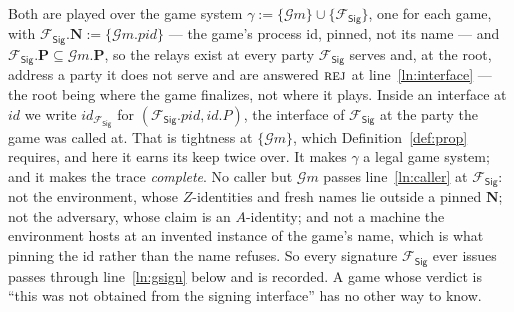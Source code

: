 \documentclass[11pt,a4paper]{article}
\newcommand{\Ps}{\mathbf{P}}
\newcommand{\PID}{\mathit{pid}}
\newcommand{\admits}{\mathbf{N}}
\newcommand{\op}[1]{\textsc{#1}}
\newcommand{\id}{id}
\newcommand{\rej}{\op{rej}}
\newcommand{\Gm}{\mathcal{G}m}
\newcommand{\Fsig}{\mathcal{F}_{\mathsf{Sig}}}
\theoremstyle{accentdef}
\theoremstyle{accentplain}
\begin{document}
Both are played over the game system $\gamma := \{\Gm\} \cup \{\Fsig\}$, one for each game, with
$\Fsig.\admits := \{\Gm.\PID\}$ --- the game's process id, pinned, not its name --- and
$\Fsig.\Ps \subseteq \Gm.\Ps$, so the relays exist at every party $\Fsig$ serves and, at the
root, address a party it does not serve and are answered $\rej$ at line~\ref{ln:interface} --- the
root being where the game finalizes, not where it plays. Inside an interface at $\id$ we write
$\id_{\Fsig}$ for $(\Fsig.\PID,\id.P)$, the interface of $\Fsig$ at the party the game was called at.
That is tightness at $\{\Gm\}$, which Definition~\ref{def:prop}
requires, and here it earns its keep twice over. It makes $\gamma$ a legal game system; and it makes
the trace \emph{complete}. No caller but $\Gm$ passes line~\ref{ln:caller} at $\Fsig$: not the
environment, whose $Z$-identities and fresh names lie outside a pinned $\admits$; not the adversary,
whose claim is an $A$-identity; and not a machine the environment hosts at an invented instance of the
game's name, which is what pinning the id rather than the name refuses. So every signature $\Fsig$
ever issues passes through line~\ref{ln:gsign} below and is recorded. A game whose verdict is
``this was not obtained from the signing interface'' has no other way to know.
\end{document}
